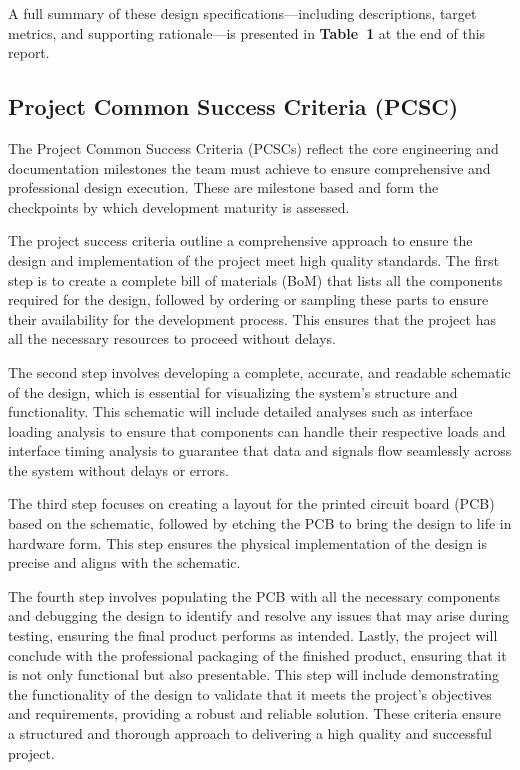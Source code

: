 \documentclass[12pt]{article}
\begin{document}
\par A full summary of these design specifications—including descriptions, target metrics, and supporting rationale—is presented in \textbf{Table~1} at the end of this report.

\subsection{Project Common Success Criteria (PCSC)}

\par The Project Common Success Criteria (PCSCs) reflect the core engineering and documentation milestones the team must achieve to ensure comprehensive and professional design execution. These are milestone based and form the checkpoints by which development maturity is assessed.

\par The project success criteria outline a comprehensive approach to ensure the design and implementation of the project meet high quality standards. The first step is to create a complete bill of materials (BoM) that lists all the components required for the design, followed by ordering or sampling these parts to ensure their availability for the development process. This ensures that the project has all the necessary resources to proceed without delays. 

\par The second step involves developing a complete, accurate, and readable schematic of the design, which is essential for visualizing the system’s structure and functionality. This schematic will include detailed analyses such as interface loading analysis to ensure that components can handle their respective loads and interface timing analysis to guarantee that data and signals flow seamlessly across the system without delays or errors.

\par The third step focuses on creating a layout for the printed circuit board (PCB) based on the schematic, followed by etching the PCB to bring the design to life in hardware form. This step ensures the physical implementation of the design is precise and aligns with the schematic. 

\par The fourth step involves populating the PCB with all the necessary components and debugging the design to identify and resolve any issues that may arise during testing, ensuring the final product performs as intended. Lastly, the project will conclude with the professional packaging of the finished product, ensuring that it is not only functional but also presentable. This step will include demonstrating the functionality of the design to validate that it meets the project's objectives and requirements, providing a robust and reliable solution. These criteria ensure a structured and thorough approach to delivering a high quality and successful project.
\end{document}
